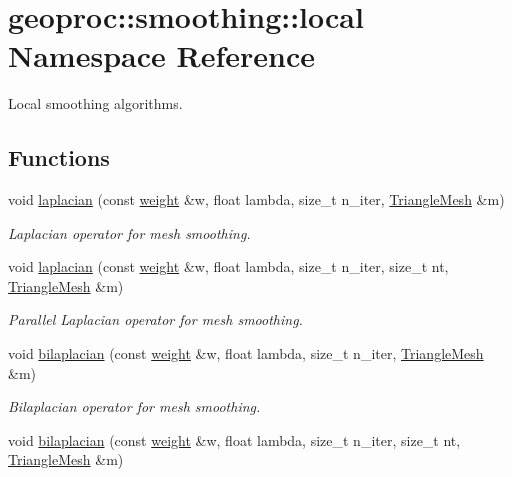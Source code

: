 \hypertarget{namespacegeoproc_1_1smoothing_1_1local}{}\section{geoproc\+:\+:smoothing\+:\+:local Namespace Reference}
\label{namespacegeoproc_1_1smoothing_1_1local}


Local smoothing algorithms.  


\subsection*{Functions}
\begin{DoxyCompactItemize}
\item 
void \hyperlink{namespacegeoproc_1_1smoothing_1_1local_afc087060b0ce1c1ce40b8e5a9969e843}{laplacian} (const \hyperlink{namespacegeoproc_a12e5a10581b53b9dd9a509127527f843}{weight} \&w, float lambda, size\+\_\+t n\+\_\+iter, \hyperlink{classgeoproc_1_1TriangleMesh}{Triangle\+Mesh} \&m)
\begin{DoxyCompactList}\small\item\em Laplacian operator for mesh smoothing. \end{DoxyCompactList}\item 
void \hyperlink{namespacegeoproc_1_1smoothing_1_1local_a1b6e158caeaf3ae121b47fab6c6edbf9}{laplacian} (const \hyperlink{namespacegeoproc_a12e5a10581b53b9dd9a509127527f843}{weight} \&w, float lambda, size\+\_\+t n\+\_\+iter, size\+\_\+t nt, \hyperlink{classgeoproc_1_1TriangleMesh}{Triangle\+Mesh} \&m)
\begin{DoxyCompactList}\small\item\em Parallel Laplacian operator for mesh smoothing. \end{DoxyCompactList}\item 
void \hyperlink{namespacegeoproc_1_1smoothing_1_1local_a5e2f0a2048d6fc14c372ea75bf70982f}{bilaplacian} (const \hyperlink{namespacegeoproc_a12e5a10581b53b9dd9a509127527f843}{weight} \&w, float lambda, size\+\_\+t n\+\_\+iter, \hyperlink{classgeoproc_1_1TriangleMesh}{Triangle\+Mesh} \&m)
\begin{DoxyCompactList}\small\item\em Bilaplacian operator for mesh smoothing. \end{DoxyCompactList}\item 
void \hyperlink{namespacegeoproc_1_1smoothing_1_1local_a8a59216ea802c3ff64b4be4b904cfa5c}{bilaplacian} (const \hyperlink{namespacegeoproc_a12e5a10581b53b9dd9a509127527f843}{weight} \&w, float lambda, size\+\_\+t n\+\_\+iter, size\+\_\+t nt, \hyperlink{classgeoproc_1_1TriangleMesh}{Triangle\+Mesh} \&m)

\end{DoxyCompactItemize}
